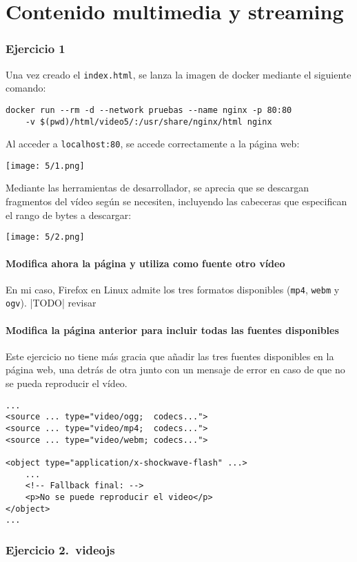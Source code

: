 \chapter{Contenido multimedia y streaming}\label{chap:5}
\subsection{Ejercicio 1}
Una vez creado el \Verb#index.html#, se lanza la imagen de docker mediante el
siguiente comando:
\begin{verbatim}
docker run --rm -d --network pruebas --name nginx -p 80:80
    -v $(pwd)/html/video5/:/usr/share/nginx/html nginx
\end{verbatim}

Al acceder a \Verb#localhost:80#, se accede correctamente a la página web: \\
\begin{minipage}{\linewidth}
	\centering
	\texttt{[image: 5/1.png]}
	\label{fig:5/1}
\end{minipage}

Mediante las herramientas de desarrollador, se aprecia que se descargan fragmentos del vídeo
según se necesiten, incluyendo las cabeceras que especifican el rango de bytes a descargar: \\
\begin{minipage}{\linewidth}
	\centering
	\texttt{[image: 5/2.png]}
	\label{fig:5/2}
\end{minipage}

\subsubsection{Modifica ahora la página y utiliza como fuente otro vídeo}
En mi caso, Firefox en Linux admite los tres formatos disponibles (\Verb#mp4#, \Verb#webm# y \Verb#ogv#).
|TODO| revisar

\subsubsection{Modifica la página anterior para incluir todas las fuentes disponibles}
Este ejercicio no tiene más gracia que añadir las tres fuentes disponibles en la página web,
una detrás de otra junto con un mensaje de error en caso de que no se pueda reproducir el vídeo.

\begin{verbatim}
...
<source ... type="video/ogg;  codecs...">
<source ... type="video/mp4;  codecs...">
<source ... type="video/webm; codecs...">

<object type="application/x-shockwave-flash" ...>
	...
	<!-- Fallback final: -->
	<p>No se puede reproducir el video</p>
</object>
...
\end{verbatim}

\subsection{Ejercicio 2.~videojs}

